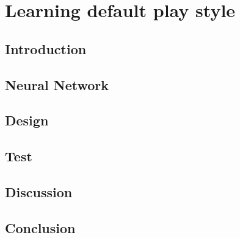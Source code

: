 \section{Learning default play style}
\subsection{Introduction}
\subsection{Neural Network}
\subsection{Design}
\subsection{Test}
\subsection{Discussion}
\subsection{Conclusion}